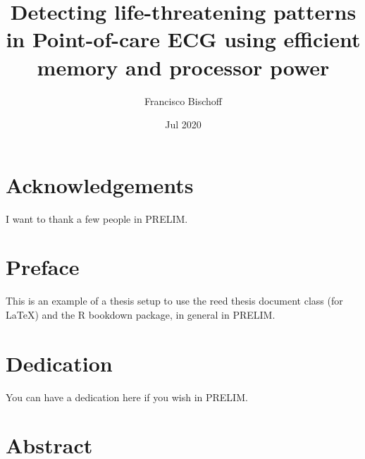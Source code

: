 \documentclass[12pt,twoside]{reedthesis}
\title{Detecting life-threatening patterns in Point-of-care ECG using efficient memory and processor power}
\author{Francisco Bischoff}
\date{Jul 2020}
\begin{document}
  \maketitle

\frontmatter %
\pagestyle{empty} %



  \hypersetup{linkcolor=black}
  \setcounter{secnumdepth}{2}
  \setcounter{tocdepth}{2}
  \tableofcontents

  \listoftables

  \listoffigures



\mainmatter %
\pagestyle{fancyplain} %

\hypertarget{acknowledgements}{%
\section*{Acknowledgements}\label{acknowledgements}}

I want to thank a few people in PRELIM.

\hypertarget{preface}{%
\section*{Preface}\label{preface}}

This is an example of a thesis setup to use the reed thesis document class (for LaTeX) and the R bookdown package, in
general in PRELIM.

\hypertarget{dedication}{%
\section*{Dedication}\label{dedication}}

You can have a dedication here if you wish in PRELIM.

\hypertarget{abstract}{%
\section*{Abstract}\label{abstract}}
\end{document}
